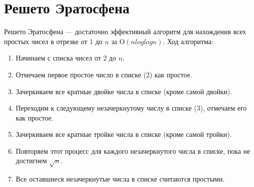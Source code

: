 \documentclass[12pt, a4paper, openany]{book}
\begin{document}
\section{Решето Эратосфена}

    Решето Эратосфена --- достаточно эффективный алгоритм для нахождения всех простых чисел в отрезке от 1 до $n$ за $\text{O}(nloglogn)$. Ход алгоритма:

\begin{enumerate}
    \item Начинаем с списка чисел от 2 до $n$.
    \item Отмечаем первое простое число в списке (2) как простое.
    \item Зачеркиваем все кратные двойке числа в списке (кроме самой двойки).
    \item Переходим к следующему незачеркнутому числу в списке (3), отмечаем его как простое.
    \item Зачеркиваем все кратные тройке числа в списке (кроме самой тройки).
    \item Повторяем этот процесс для каждого незачеркнутого числа в списке, пока не достигнем $\sqrt{n}$.
    \item Все оставшиеся незачеркнутые числа в списке считаются простыми.
\end{enumerate}
\end{document}
